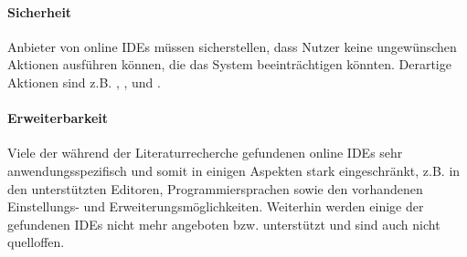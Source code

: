 \paragraph{Sicherheit}
Anbieter von online IDEs müssen sicherstellen, dass Nutzer keine ungewünschen Aktionen ausführen können, die das System beeinträchtigen könnten. Derartige Aktionen sind z.B. , ,  \cite{wu_ceclipse_2011} und  \cite{srinivasa_bad_2022}.

\paragraph{Erweiterbarkeit}
Viele der während der Literaturrecherche gefundenen online IDEs sehr anwendungsspezifisch und somit in einigen Aspekten stark eingeschränkt, z.B. in den unterstützten Editoren, Programmiersprachen sowie den vorhandenen Einstellungs- und Erweiterungsmöglichkeiten. Weiterhin werden einige der gefundenen IDEs nicht mehr angeboten bzw. unterstützt und sind auch nicht quelloffen.
